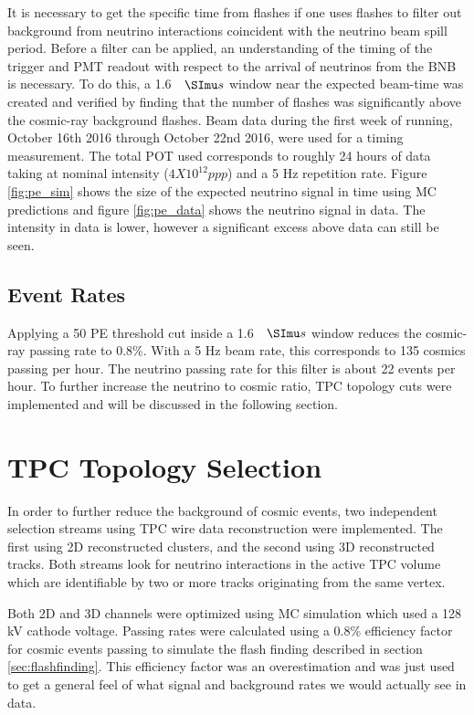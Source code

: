 It is necessary to get the specific time from flashes if one uses flashes to filter out background from neutrino interactions coincident with the neutrino beam spill period. Before a filter can be applied, an understanding of the timing of the trigger and PMT readout with respect to the arrival of neutrinos from the BNB is necessary. To do this, a 1.6 $\micro s$ window near the expected beam-time was created and verified by finding that the number of flashes was significantly above the cosmic-ray background flashes. Beam data during the first week of running, October 16th 2016 through October 22nd 2016, were used for a timing measurement. The total POT used corresponds to roughly 24 hours of data taking at nominal intensity ($4 X 10^{12} ppp$) and a 5 Hz repetition rate. Figure \ref{fig:pe_sim} shows the size of the expected neutrino signal in time using MC predictions and figure \ref{fig:pe_data} shows the neutrino signal in data. The intensity in data is lower, however a significant excess above data can still be seen.

\subsection{Event Rates}
Applying a 50 PE threshold cut inside a 1.6 $\micro s$ window reduces the cosmic-ray passing rate to 0.8\%. With a 5 Hz beam rate, this corresponds to 135 cosmics passing per hour. The neutrino passing rate for this filter is about 22 events per hour. To further increase the neutrino to cosmic ratio, TPC topology cuts were implemented and will be discussed in the following section.
\section{TPC Topology Selection}  
In order to further reduce the background of cosmic events, two independent selection streams using TPC wire data reconstruction were implemented. The first using 2D reconstructed clusters, and the second using 3D reconstructed tracks. Both streams look for neutrino interactions in the active TPC volume which are identifiable by two or more tracks originating from the same vertex.

Both 2D and 3D channels were optimized using MC simulation which used a 128 kV cathode voltage. Passing rates were calculated using a 0.8\% efficiency factor for cosmic events passing to simulate the flash finding described in section \ref{sec:flashfinding}. This efficiency factor was an overestimation and was just used to get a general feel of what signal and background rates we would actually see in data. 
